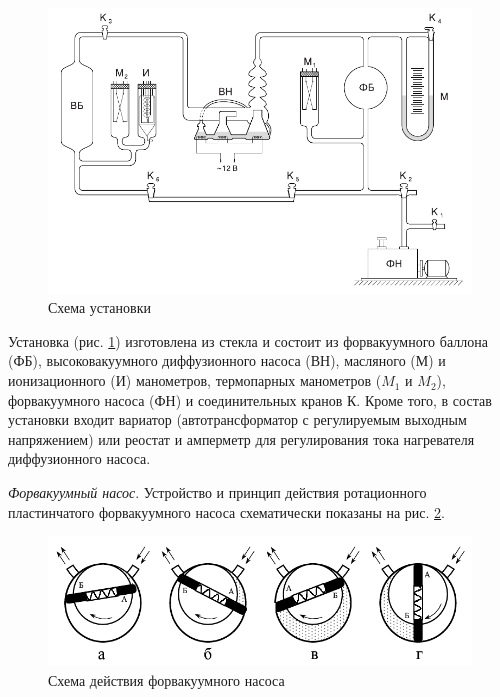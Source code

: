 \documentclass[12pt]{article}
\newcommand{\fref}[1]{рис. \ref{#1}}
\begin{document}
	\begin{figure}[h!]
	\caption{Схема установки}
	\label{fig:scheme}
	\begin{center}
	\includegraphics[scale=.6]{scheme.png}
	\end{center}
	\end{figure}
	
	Установка (\fref{fig:scheme}) изготовлена из стекла и состоит из форвакуумного баллона (ФБ), высоковакуумного диффузионного насоса (ВН), масляного (М) и ионизационного (И) манометров, термопарных манометров ($M_1$ и $M_2$), форвакуумного насоса (ФН) и соединительных кранов К. Кроме того, в состав установки входит вариатор (автотрансформатор с регулируемым выходным напряжением) или реостат и амперметр для регулирования тока нагревателя диффузионного насоса.
	
	\textit{Форвакуумный насос}. Устройство и принцип действия ротационного пластинчатого форвакуумного насоса схематически показаны на \fref{fig:scheme-fv}.
	
	\begin{figure}[h!]
	\caption{Схема действия форвакуумного насоса}
	\label{fig:scheme-fv}
	\begin{center}
	\includegraphics[scale=.6]{scheme1.png}
	\end{center}
	\end{figure}
	
\end{document}

